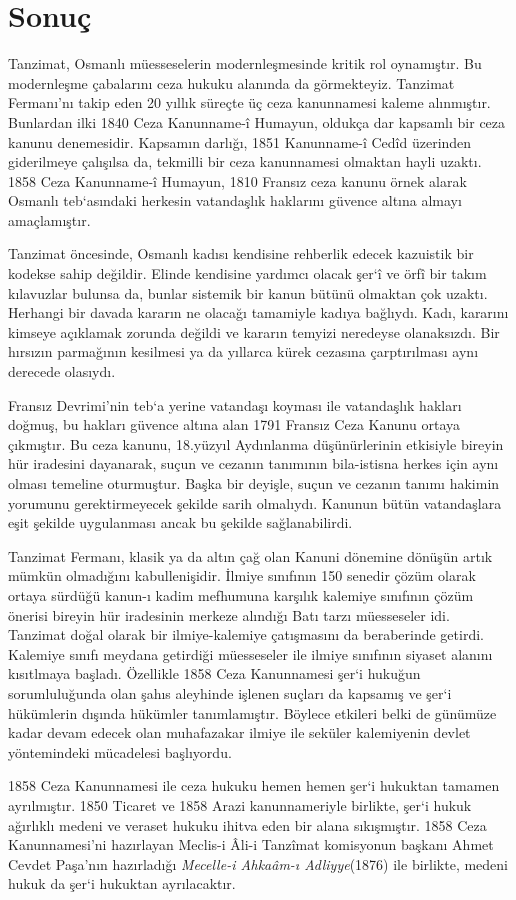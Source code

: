\section{Sonuç}
\indent\indent Tanzimat, Osmanlı müesseselerin modernleşmesinde kritik rol oynamıştır. Bu modernleşme çabalarını ceza hukuku alanında da görmekteyiz. Tanzimat Fermanı'nı takip eden 20 yıllık süreçte üç ceza 
kanunnamesi kaleme alınmıştır. Bunlardan ilki 1840 Ceza Kanunname-î Humayun, oldukça dar kapsamlı bir ceza kanunu denemesidir. Kapsamın darlığı, 1851 Kanunname-î Cedîd üzerinden giderilmeye çalışılsa da,
tekmilli bir ceza kanunnamesi olmaktan hayli uzaktı. 1858 Ceza Kanunname-î Humayun, 1810 Fransız ceza kanunu örnek alarak Osmanlı teb`asındaki herkesin vatandaşlık haklarını güvence altına almayı amaçlamıştır.

Tanzimat öncesinde, Osmanlı kadısı kendisine rehberlik edecek kazuistik bir kodekse sahip değildir. Elinde kendisine yardımcı olacak şer`î ve örfî bir takım kılavuzlar bulunsa da, bunlar sistemik bir kanun bütünü 
olmaktan çok uzaktı. Herhangi bir davada kararın ne olacağı tamamiyle kadıya bağlıydı. Kadı, kararını kimseye açıklamak zorunda değildi ve kararın temyizi neredeyse olanaksızdı. Bir hırsızın parmağının kesilmesi 
ya da yıllarca kürek cezasına çarptırılması aynı derecede olasıydı.

Fransız Devrimi'nin teb`a yerine vatandaşı koyması ile vatandaşlık hakları doğmuş, bu hakları güvence altına alan 1791 Fransız Ceza Kanunu ortaya çıkmıştır. Bu ceza kanunu, 18.yüzyıl Aydınlanma düşünürlerinin etkisiyle
bireyin hür iradesini dayanarak, suçun ve cezanın tanımının bila-istisna herkes için aynı olması temeline oturmuştur. Başka bir deyişle, suçun ve cezanın tanımı hakimin yorumunu gerektirmeyecek şekilde sarih olmalıydı.
Kanunun bütün vatandaşlara eşit şekilde uygulanması ancak bu şekilde sağlanabilirdi.

Tanzimat Fermanı, klasik ya da altın çağ olan Kanuni dönemine dönüşün artık mümkün olmadığını kabullenişidir. İlmiye sınıfının 150 senedir çözüm olarak ortaya sürdüğü kanun-ı kadim mefhumuna karşılık kalemiye sınıfının
çözüm önerisi bireyin hür iradesinin merkeze alındığı Batı tarzı müesseseler idi. Tanzimat doğal olarak bir ilmiye-kalemiye çatışmasını da beraberinde getirdi. Kalemiye sınıfı meydana getirdiği müesseseler ile ilmiye sınıfının 
siyaset alanını kısıtlmaya başladı. Özellikle 1858 Ceza Kanunnamesi şer`i hukuğun sorumluluğunda olan şahıs aleyhinde işlenen suçları da kapsamış ve şer`i hükümlerin dışında hükümler tanımlamıştır. Böylece etkileri belki de 
günümüze kadar devam edecek olan muhafazakar ilmiye ile seküler kalemiyenin devlet yöntemindeki mücadelesi başlıyordu.

1858 Ceza Kanunnamesi ile ceza hukuku hemen hemen şer`i hukuktan tamamen ayrılmıştır. 1850 Ticaret ve 1858 Arazi kanunnameriyle birlikte, şer`i hukuk ağırlıklı medeni ve veraset hukuku ihitva eden bir alana sıkışmıştır. 1858 Ceza 
Kanunnamesi'ni hazırlayan Meclis-i Âli-i Tanzîmat komisyonun başkanı Ahmet Cevdet Paşa'nın hazırladığı \textit{Mecelle-i Ahkaâm-ı Adliyye}(1876) ile birlikte, medeni hukuk da şer`i hukuktan ayrılacaktır.
